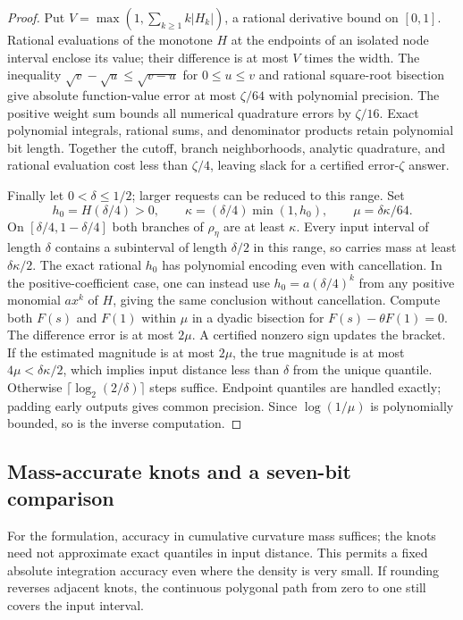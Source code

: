 \begin{proof}
Put $V=\max(1,\sum_{k\ge1}k|H_k|)$, a rational derivative bound
on $[0,1]$. Rational evaluations of the monotone $H$ at the endpoints
of an isolated node interval enclose its value; their difference is at
most $V$ times the width. The inequality
$\sqrt v-\sqrt u\le\sqrt{v-u}$ for $0\le u\le v$ and rational
square-root bisection give absolute function-value error at most
$\zeta/64$ with polynomial precision. The positive weight sum bounds
all numerical quadrature errors by $\zeta/16$. Exact polynomial
integrals, rational sums, and denominator products retain polynomial
bit length. Together the cutoff, branch neighborhoods, analytic
quadrature, and rational evaluation cost less than $\zeta/4$, leaving
slack for a certified error-$\zeta$ answer.

Finally let $0<\delta\le1/2$; larger requests can be reduced to this
range. Set
\begin{equation}\label{eq:quantile-inverse-modulus}
 h_0=H(\delta/4)>0,\qquad
 \kappa=(\delta/4)\min(1,h_0),\qquad
 \mu=\delta\kappa/64.
\end{equation}
On $[\delta/4,1-\delta/4]$ both branches of $\rho_\eta$ are at
least $\kappa$. Every input interval of length $\delta$ contains a
subinterval of length $\delta/2$ in this range, so carries mass at
least $\delta\kappa/2$. The exact rational $h_0$ has polynomial
encoding even with cancellation. In the positive-coefficient case,
one can instead use $h_0=a(\delta/4)^k$ from any positive monomial
$a x^k$ of $H$, giving the same conclusion without cancellation.
Compute both $F(s)$ and $F(1)$ within $\mu$ in a dyadic bisection
for $F(s)-\theta F(1)=0$. The difference error is at most $2\mu$.
A certified nonzero sign updates the bracket. If the estimated
magnitude is at most $2\mu$, the true magnitude is at most
$4\mu<\delta\kappa/2$, which implies input distance less than
$\delta$ from the unique quantile. Otherwise
$\lceil\log_2(2/\delta)\rceil$ steps suffice. Endpoint quantiles
are handled exactly; padding early outputs gives common precision.
Since $\log(1/\mu)$ is polynomially bounded, so is the inverse
computation.
\end{proof}

\subsection{Mass-accurate knots and a seven-bit comparison}

For the formulation, accuracy in cumulative curvature mass suffices;
the knots need not approximate exact quantiles in input distance.
This permits a fixed absolute integration accuracy even where the
density is very small. If rounding reverses adjacent knots, the
continuous polygonal path from zero to one still covers the input
interval.

